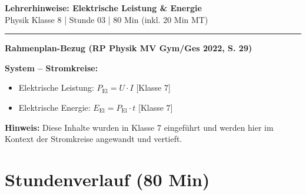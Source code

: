 \documentclass[11pt, a4paper]{article}
\newcommand{\fach}{Physik}
\newcommand{\thema}{Elektrische Leistung \& Energie}
\newcommand{\klasse}{8}
\newcommand{\stunde}{03}
\begin{document}
\begin{center}
    {\Large\bfseries\textcolor{lehrer}{Lehrerhinweise: \thema}}\\[0.2em]
    {\small \fach{} Klasse \klasse{} | Stunde \stunde{} | 80 Min (inkl. 20 Min MT)}
\end{center}
\vspace{-0.3em}
\hrule
\vspace{0.8em}


\begin{infobox}
\textbf{Rahmenplan-Bezug (RP Physik MV Gym/Ges 2022, S. 29)}

\textbf{System – Stromkreise:}
\begin{itemize}[leftmargin=1.5em, itemsep=2pt]
    \item Elektrische Leistung: $P_{\text{El}} = U \cdot I$ \hfill [Klasse 7]
    \item Elektrische Energie: $E_{\text{El}} = P_{\text{El}} \cdot t$ \hfill [Klasse 7]
\end{itemize}

\textbf{Hinweis:} Diese Inhalte wurden in Klasse 7 eingeführt und werden hier im Kontext der Stromkreise angewandt und vertieft.
\end{infobox}


\section*{Stundenverlauf (80 Min)}
\end{document}
